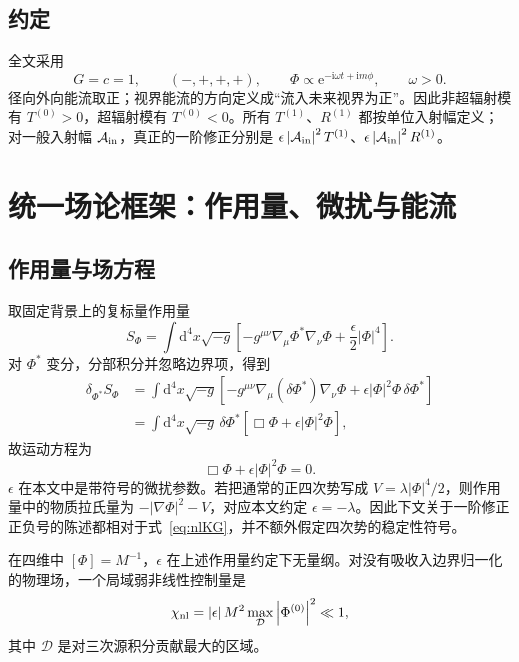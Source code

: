 \documentclass[UTF8,fontset=fandol,12pt,a4paper,oneside,openany]{ctexrep}
\newcommand{\dd}{\mathrm d}
\newcommand{\ii}{\mathrm i}
\newcommand{\ee}{\mathrm e}
\newcommand{\abs}[1]{\left|#1\right|}
\begin{document}
\subsection{约定}

全文采用
\begin{equation}
G=c=1,\qquad (-,+,+,+),\qquad
\Phi\propto \ee^{-\ii\omega t+\ii m\phi},\qquad \omega>0.
\end{equation}
径向外向能流取正；视界能流的方向定义成“流入未来视界为正”。因此非超辐射模有 $T^{(0)}>0$，超辐射模有 $T^{(0)}<0$。所有 $T^{(1)}$、$R^{(1)}$ 都按单位入射幅定义；对一般入射幅 $\mathcal A_{\rm in}$，真正的一阶修正分别是 $\epsilon\abs{\mathcal A_{\rm in}}^2T^{(1)}$、$\epsilon\abs{\mathcal A_{\rm in}}^2R^{(1)}$。

\section{统一场论框架：作用量、微扰与能流}
\label{sec:field-theory}

\subsection{作用量与场方程}

取固定背景上的复标量作用量
\begin{equation}
S_\Phi=\int \dd^4x\sqrt{-g}\left[
-g^{\mu\nu}\nabla_\mu\Phi^*\nabla_\nu\Phi
+\frac{\epsilon}{2}\abs{\Phi}^4\right].
\label{eq:action}
\end{equation}
对 $\Phi^*$ 变分，分部积分并忽略边界项，得到
\begin{align}
\delta_{\Phi^*}S_\Phi
&=\int\dd^4x\sqrt{-g}\left[
-g^{\mu\nu}\nabla_\mu(\delta\Phi^*)\nabla_\nu\Phi
+\epsilon\abs{\Phi}^2\Phi\,\delta\Phi^*\right]\nonumber\\
&=\int\dd^4x\sqrt{-g}\,\delta\Phi^*
\left[\Box\Phi+\epsilon\abs{\Phi}^2\Phi\right],
\end{align}
故运动方程为
\begin{equation}
\boxed{\Box\Phi+\epsilon\abs{\Phi}^2\Phi=0.}
\label{eq:nlKG}
\end{equation}
$\epsilon$ 在本文中是带符号的微扰参数。若把通常的正四次势写成 $V=\lambda\abs{\Phi}^4/2$，则作用量中的物质拉氏量为 $-\abs{\nabla\Phi}^2-V$，对应本文约定 $\epsilon=-\lambda$。因此下文关于一阶修正正负号的陈述都相对于式~\eqref{eq:nlKG}，并不额外假定四次势的稳定性符号。

在四维中 $[\Phi]=M^{-1}$，$\epsilon$ 在上述作用量约定下无量纲。对没有吸收入边界归一化的物理场，一个局域弱非线性控制量是
\begin{equation}
\chi_{\rm nl}=\abs{\epsilon}M^2
\max_{\mathcal D}\abs{\Phi^{(0)}}^2\ll1,
\label{eq:chi}
\end{equation}
其中 $\mathcal D$ 是对三次源积分贡献最大的区域。
\end{document}
